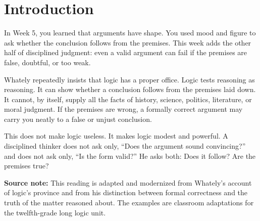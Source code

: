 \documentclass[12pt]{article}
\newcommand{\focusbox}[1]{\par\vspace{0.4em}\noindent\begingroup\setlength{\fboxsep}{6pt}\colorbox{gray!12}{\begin{minipage}{\dimexpr\linewidth-2\fboxsep\relax}#1\end{minipage}}\endgroup\par\vspace{0.5em}}
\begin{document}
\section*{Introduction}
In Week 5, you learned that arguments have shape. You used mood and figure to ask whether the conclusion follows from the premises. This week adds the other half of disciplined judgment: even a valid argument can fail if the premises are false, doubtful, or too weak.

Whately repeatedly insists that logic has a proper office. Logic tests reasoning as reasoning. It can show whether a conclusion follows from the premises laid down. It cannot, by itself, supply all the facts of history, science, politics, literature, or moral judgment. If the premises are wrong, a formally correct argument may carry you neatly to a false or unjust conclusion.

This does not make logic useless. It makes logic modest and powerful. A disciplined thinker does not ask only, ``Does the argument sound convincing?'' and does not ask only, ``Is the form valid?'' He asks both: Does it follow? Are the premises true?

\focusbox{\textbf{Source note:} This reading is adapted and modernized from Whately's account of logic's province and from his distinction between formal correctness and the truth of the matter reasoned about. The examples are classroom adaptations for the twelfth-grade long logic unit.}
\end{document}
